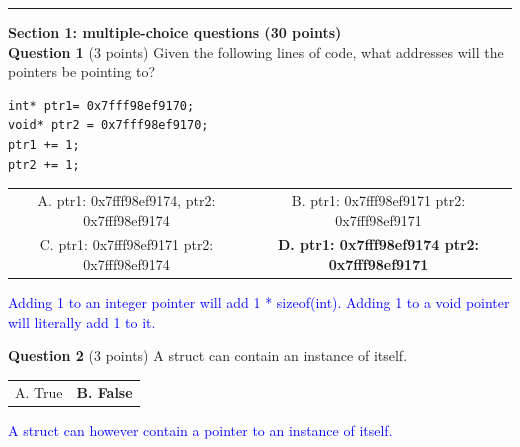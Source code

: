 \documentclass{exam}
\begin{document}
\newpage




\begin{center}\noindent\rule{6in}{0.4pt}\end{center}

{\Large\textbf{Section 1: multiple-choice questions (30 points)}}
\\

\textbf{Question 1} (3 points) Given the following lines of code, what addresses will the pointers be pointing to?

\begin{lstlisting}
int* ptr1= 0x7fff98ef9170;
void* ptr2 = 0x7fff98ef9170;
ptr1 += 1;
ptr2 += 1;
\end{lstlisting}

\begin{center}

\begin{tabular} { c  c } 
  A. ptr1: 0x7fff98ef9174, ptr2: 0x7fff98ef9174 & B. ptr1: 0x7fff98ef9171 ptr2: 0x7fff98ef9171 \\ 

  C. ptr1: 0x7fff98ef9171 ptr2: 0x7fff98ef9174 & \textbf{D. ptr1: 0x7fff98ef9174 ptr2: 0x7fff98ef9171}
\end{tabular}

\vspace{5px}
\textcolor{blue}{Adding 1 to an integer pointer will add 1 * sizeof(int). Adding 1 to a void pointer will literally add 1 to it.}

\end{center}

\vspace{10px}

\textbf{Question 2} (3 points) A struct can contain an instance of itself.

\begin{center}

\begin{tabular} { c  c } 
  A. True & \textbf{B. False} \\ 
\end{tabular}

\vspace{5px}
\textcolor{blue}{A struct can however contain a pointer to an instance of itself.}

\end{center}
\end{document}
